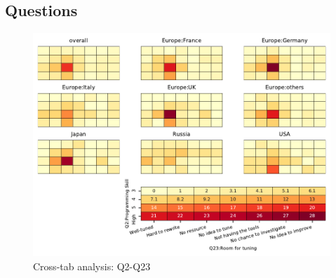 
\subsection{Questions}


\begin{figure}
\begin{center}
\includegraphics[width=12cm]{../pdfs/Q2-Q23.pdf}
\caption{Cross-tab analysis: Q2-Q23}
\label{fig:Q2-Q23}
\end{center}
\end{figure}
